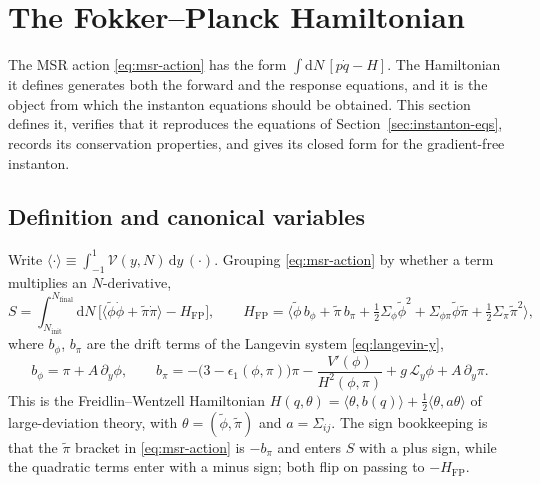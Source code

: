 \documentclass[a4paper,11pt]{article}
\renewcommand{\d}{\mathrm{d}}
\newcommand{\Ny}{N}                          %
\newcommand{\Ninit}{N_{\mathrm{init}}}       %
\newcommand{\Nfinal}{N_{\mathrm{final}}}     %
\newcommand{\epsSR}{\epsilon_1}              %
\newcommand{\Hub}{H}                         %
\newcommand{\atloc}{(\field,\mom)}           %
\newcommand{\field}{\phi}                    %
\newcommand{\mom}{\pi}                       %
\newcommand{\Vpot}{V}                        %
\newcommand{\rfield}{\widetilde\field}       %
\newcommand{\rmom}{\widetilde\mom}           %
\newcommand{\yco}{y}                         %
\newcommand{\advcoef}{A}                     %
\newcommand{\Lop}{\mathcal{L}_\yco}          %
\newcommand{\volel}{\mathcal{V}}             %
\newcommand{\Sigvol}[1]{\varSigma_{#1}}      %
\newcommand{\Hfp}{H_{\mathrm{FP}}}            %
\newcommand{\gpref}{g}                        %
\begin{document}
\section{The Fokker--Planck Hamiltonian}
\label{sec:hfp}

The MSR action \eqref{eq:msr-action} has the form $\int\d\Ny\,[p\dot q-H]$.
The Hamiltonian it defines generates both the forward and the response
equations, and it is the object from which the instanton equations should
be obtained. This section defines it, verifies that it reproduces the
equations of Section~\ref{sec:instanton-eqs}, records its conservation
properties, and gives its closed form for the gradient-free instanton.

\subsection{Definition and canonical variables}

Write $\langle\cdot\rangle \equiv \int_{-1}^{1}\volel(\yco,\Ny)\,\d\yco\,(\cdot)$.
Grouping \eqref{eq:msr-action} by whether a term multiplies an
$\Ny$-derivative,
\begin{equation}
    S = \int_{\Ninit}^{\Nfinal}\d\Ny\,\Big[\big\langle\rfield\dot\field+\rmom\dot\mom\big\rangle - \Hfp\Big] ,
    \qquad
    \Hfp = \Big\langle \rfield\,b_\field + \rmom\,b_\mom
    + \tfrac12\Sigvol{\field}\rfield^2 + \Sigvol{\field\mom}\rfield\rmom + \tfrac12\Sigvol{\mom}\rmom^2 \Big\rangle ,
    \label{eq:hfp-definition}
\end{equation}
where $b_\field$, $b_\mom$ are the drift terms of the Langevin system
\eqref{eq:langevin-y},
\begin{equation}
    b_\field = \mom + \advcoef\,\partial_\yco\field ,
    \qquad
    b_\mom = -\big(3-\epsSR\atloc\big)\mom - \frac{\Vpot'(\field)}{\Hub^2\atloc}
    + \gpref\,\Lop\field + \advcoef\,\partial_\yco\mom .
    \label{eq:drift-definition}
\end{equation}
This is the Freidlin--Wentzell Hamiltonian
$H(q,\theta)=\langle\theta,b(q)\rangle+\tfrac12\langle\theta,a\theta\rangle$
of large-deviation theory, with $\theta=(\rfield,\rmom)$ and
$a=\Sigvol{ij}$. The sign bookkeeping is that the $\rmom$ bracket in
\eqref{eq:msr-action} is $-b_\mom$ and enters $S$ with a plus sign, while
the quadratic terms enter with a minus sign; both flip on passing to
$-\Hfp$.
\end{document}
